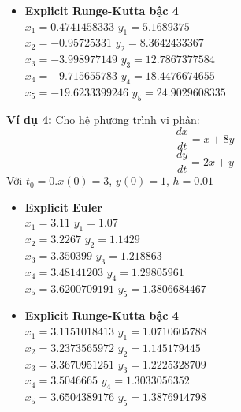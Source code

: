 \documentclass[a4paper]{article}
\begin{document}
\begin{flushleft}
    \begin{itemize}
        \item \textbf{Explicit Runge-Kutta bậc 4 \\}
        $x_1=0.4741458333$ \hspace*{1.43cm} $y_1=5.1689375$ \\
        $x_2=-0.95725331$ \hspace*{1.5cm} $y_2=8.3642433367$ \\
        $x_3=-3.998977149$ \hspace*{1.33cm} $y_3=12.7867377584$ \\
        $x_4=-9.715655783$ \hspace*{1.33cm} $y_4=18.4476674655$ \\
        $x_5=-19.6233399246$ \hspace*{0.98cm} $y_5=24.9029608335$
    \end{itemize}
    
    \textbf{Ví dụ 4: }
    Cho hệ phương trình vi phân:
        \[\frac{dx}{dt} = x + 8y\]
        \[\frac{dy}{dt} = 2x + y\]
    Với $t_0=0$.$x(0) = 3$, $y(0) = 1$, $h=0.01$
    \begin{itemize}
        \item \textbf{Explicit Euler \\}
        $x_1=3.11$ \hspace*{2.83cm} $y_1=1.07$ \\
        $x_2=3.2267$ \hspace*{2.48cm} $y_2=1.1429$ \\
        $x_3=3.350399$ \hspace*{2.13cm} $y_3=1.218863$ \\
        $x_4=3.48141203$ \hspace*{1.78cm} $y_4=1.29805961$ \\
        $x_5=3.6200709191$ \hspace*{1.43cm} $y_5=1.3806684467$
    \end{itemize}
    
    \begin{itemize}
        \item \textbf{Explicit Runge-Kutta bậc 4 \\}
        $x_1=3.1151018413$ \hspace*{1.43cm} $y_1=1.0710605788$ \\
        $x_2=3.2373565972$ \hspace*{1.43cm} $y_2=1.145179445$ \\
        $x_3=3.3670951251$ \hspace*{1.43cm} $y_3=1.2225328709$ \\
        $x_4=3.5046665$ \hspace*{1.95cm} $y_4=1.3033056352$ \\
        $x_5=3.6504389176$ \hspace*{1.43cm} $y_5=1.3876914798$
    \end{itemize}
    

\end{flushleft}
\end{document}
